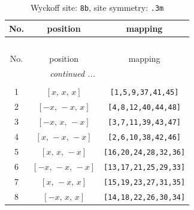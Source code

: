 \documentclass[fleqn,8pt]{jsarticle}
\begin{document}
\renewcommand{\arraystretch}{1.2}
\begin{longtable}{ccc}
\caption{Wyckoff site: {\tt 8b}, site symmetry: {\tt .3m}}
 \\
 \hline \hline
No. & position & mapping \\ \hline \endfirsthead

\multicolumn{2}{l}{\tablename\ \thetable{}} \\
 \hline \hline
No. & position & mapping \\ \hline \endhead

 \hline \hline
\multicolumn{2}{r}{\footnotesize\it continued ...} \\ \endfoot

 \hline \hline
\multicolumn{2}{r}{} \\ \endlastfoot

1 & $\left[ x,\, x,\, x \right]$ & {\tt [1,5,9,37,41,45]} \\ \hline
2 & $\left[ - x,\, - x,\, x \right]$ & {\tt [4,8,12,40,44,48]} \\ \hline
3 & $\left[ - x,\, x,\, - x \right]$ & {\tt [3,7,11,39,43,47]} \\ \hline
4 & $\left[ x,\, - x,\, - x \right]$ & {\tt [2,6,10,38,42,46]} \\ \hline
5 & $\left[ x,\, x,\, - x \right]$ & {\tt [16,20,24,28,32,36]} \\ \hline
6 & $\left[ - x,\, - x,\, - x \right]$ & {\tt [13,17,21,25,29,33]} \\ \hline
7 & $\left[ x,\, - x,\, x \right]$ & {\tt [15,19,23,27,31,35]} \\ \hline
8 & $\left[ - x,\, x,\, x \right]$ & {\tt [14,18,22,26,30,34]} \\
\end{longtable}
\renewcommand{\arraystretch}{1.2}
\end{document}
